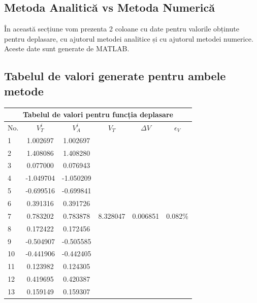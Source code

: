 \documentclass[12pt, a4paper]{article}
\begin{document}
\begin{samepage}
\section{Metoda Analitică vs Metoda Numerică}
\hspace{0.5cm}În această secțiune vom prezenta 2 coloane cu date pentru valorile obținute pentru deplasare, cu ajutorul metodei analitice și cu ajutorul metodei numerice. Aceste date sunt generate de MATLAB.

\subsection{Tabelul de valori generate pentru ambele metode}
\begin{center}
    \begin{tabular}{| l | c | c | c | c | c |}
         \hline
         \multicolumn{6}{|c|}{Tabelul de valori pentru funcția deplasare} \\
         \hline
         No. & $V^{i}_T$ & $V^{i}_A$ & $V_T$ & $\Delta V$ & $\epsilon_V$ \\
         \hline
         1 & 1.002697 & 1.002697 & \multirow{20}{*}{8.328047} & \multirow{20}{*}{0.006851} & \multirow{20}{*}{0.082\%}\\
         \cline{1-3}
         2 & 1.408086 & 1.408280 & & &\\
         \cline{1-3}
         3 & 0.077000 & 0.076943 & & &\\
         \cline{1-3}
         4 & -1.049704 & -1.050209 & & &\\
         \cline{1-3}
         5 & -0.699516 & -0.699841 & & &\\
         \cline{1-3}
         6 & 0.391316 & 0.391726 & & &\\
         \cline{1-3}
         7 & 0.783202 & 0.783878 & & &\\
         \cline{1-3}
         8 & 0.172422 & 0.172456 & & &\\
         \cline{1-3}
         9 & -0.504907 & -0.505585 & & &\\
         \cline{1-3}
         10 & -0.441906 & -0.442405 & & &\\
         \cline{1-3}
         11 & 0.123982 & 0.124305 & & &\\
         \cline{1-3}
         12 & 0.419695 & 0.420387 & & &\\
         \cline{1-3}
         13 & 0.159149 & 0.159307 & & &\\
         \cline{1-3}

\end{tabular}
\end{center}
\end{samepage}
\end{document}
